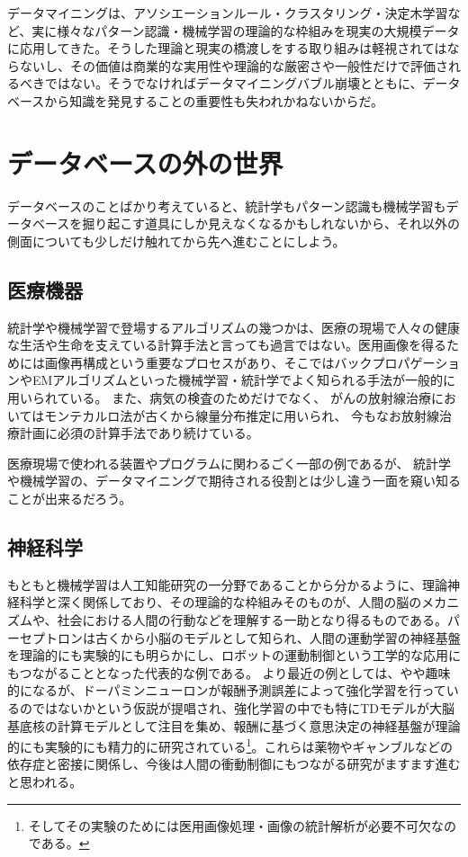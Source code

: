 データマイニングは、アソシエーションルール・クラスタリング・決定木学習など、実に様々なパターン認識・機械学習の理論的な枠組みを現実の大規模データに応用してきた。そうした理論と現実の橋渡しをする取り組みは軽視されてはならないし、その価値は商業的な実用性や理論的な厳密さや一般性だけで評価されるべきではない。そうでなければデータマイニングバブル崩壊とともに、データベースから知識を発見することの重要性も失われかねないからだ。

\section{データベースの外の世界}
データベースのことばかり考えていると、統計学もパターン認識も機械学習もデータベースを掘り起こす道具にしか見えなくなるかもしれないから、それ以外の側面についても少しだけ触れてから先へ進むことにしよう。
\subsection{医療機器}
統計学や機械学習で登場するアルゴリズムの幾つかは、医療の現場で人々の健康な生活や生命を支えている計算手法と言っても過言ではない。医用画像を得るためには画像再構成という重要なプロセスがあり、そこではバックプロパゲーションやEMアルゴリズムといった機械学習・統計学でよく知られる手法が一般的に用いられている。
また、病気の検査のためだけでなく、
がんの放射線治療においてはモンテカルロ法が古くから線量分布推定に用いられ、
今もなお放射線治療計画に必須の計算手法であり続けている。

医療現場で使われる装置やプログラムに関わるごく一部の例であるが、
統計学や機械学習の、データマイニングで期待される役割とは少し違う一面を窺い知ることが出来るだろう。

\subsection{神経科学}
もともと機械学習は人工知能研究の一分野であることから分かるように、理論神経科学と深く関係しており、その理論的な枠組みそのものが、人間の脳のメカニズムや、社会における人間の行動などを理解する一助となり得るものである。パーセプトロンは古くから小脳のモデルとして知られ、人間の運動学習の神経基盤を理論的にも実験的にも明らかにし、ロボットの運動制御という工学的な応用にもつながることとなった代表的な例である。
より最近の例としては、やや趣味的になるが、ドーパミンニューロンが報酬予測誤差によって強化学習を行っているのではないかという仮説が提唱され、強化学習の中でも特にTDモデルが大脳基底核の計算モデルとして注目を集め、報酬に基づく意思決定の神経基盤が理論的にも実験的にも精力的に研究されている\footnote{そしてその実験のためには医用画像処理・画像の統計解析が必要不可欠なのである。}。これらは薬物やギャンブルなどの依存症と密接に関係し、今後は人間の衝動制御にもつながる研究がますます進むと思われる。

